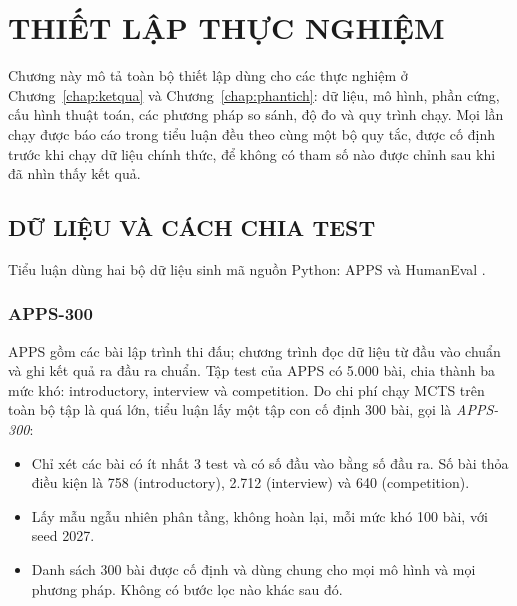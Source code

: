 \chapter{THIẾT LẬP THỰC NGHIỆM}
\label{chap:thietlap}

Chương này mô tả toàn bộ thiết lập dùng cho các thực nghiệm ở Chương~\ref{chap:ketqua} và Chương~\ref{chap:phantich}: dữ liệu, mô hình, phần cứng, cấu hình thuật toán, các phương pháp so sánh, độ đo và quy trình chạy. Mọi lần chạy được báo cáo trong tiểu luận đều theo cùng một bộ quy tắc, được cố định trước khi chạy dữ liệu chính thức, để không có tham số nào được chỉnh sau khi đã nhìn thấy kết quả.

\section{DỮ LIỆU VÀ CÁCH CHIA TEST}
\label{sec:dulieu}

Tiểu luận dùng hai bộ dữ liệu sinh mã nguồn Python: APPS \cite{hendrycks2021apps} và HumanEval \cite{chen2021humaneval}.

\subsection{APPS-300}

APPS gồm các bài lập trình thi đấu; chương trình đọc dữ liệu từ đầu vào chuẩn và ghi kết quả ra đầu ra chuẩn. Tập test của APPS có 5.000 bài, chia thành ba mức khó: introductory, interview và competition. Do chi phí chạy MCTS trên toàn bộ tập là quá lớn, tiểu luận lấy một tập con cố định 300 bài, gọi là \emph{APPS-300}:

\begin{itemize}
  \item Chỉ xét các bài có ít nhất 3 test và có số đầu vào bằng số đầu ra. Số bài thỏa điều kiện là 758 (introductory), 2.712 (interview) và 640 (competition).
  \item Lấy mẫu ngẫu nhiên phân tầng, không hoàn lại, mỗi mức khó 100 bài, với seed 2027.
  \item Danh sách 300 bài được cố định và dùng chung cho mọi mô hình và mọi phương pháp. Không có bước lọc nào khác sau đó.
\end{itemize}

